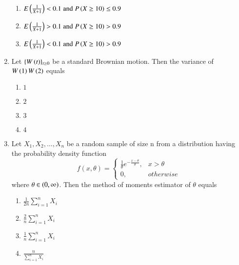 \documentclass[journal,12pt,onecolumn]{IEEEtran}
\theoremstyle{remark}
\begin{document}
\begin{enumerate}
\begin{enumerate}
    \item $E\left(\frac{1}{X+1}\right)<0.1 \; \text{and} \; P\left(X\geq10\right)\leq0.9$
    \item $E\left(\frac{1}{X+1}\right)>0.1 \; \text{and} \; P\left(X\geq10\right)>0.9$
    \item $E\left(\frac{1}{X+1}\right)<0.1 \; \text{and} \; P\left(X\geq10\right)>0.9$
\end{enumerate}
\item Let $\{W\left(t\right)\}_{t\geq 0}$ be a standard Brownian motion. Then the variance of $W\left(1\right)W\left(2\right)$ equals
\begin{enumerate}
    \item $1$
    \item $2$
    \item $3$
    \item $4$
\end{enumerate}
\item Let $X_1,X_2,\ldots,X_n$ be a random sample of size n from a distribution having the probability density function
$$
f(x,\theta) = 
\begin{cases} 
    \frac{1}{\theta}e^{-\frac{x-\theta}{\theta}}, &  x > \theta \\ 
    0, &  otherwise 
\end{cases}
$$ where $\theta \in \left(0,\infty\right)$. Then the method of moments estimator of $\theta$ equals
\begin{enumerate}
    \item $\frac{1}{2n}\sum_{i=1}^nX_i$
    \item $\frac{2}{n}\sum_{i=1}^nX_i$
    \item $\frac{1}{n}\sum_{i=1}^nX_i$
    \item $\frac{n}{\sum_{i=1}^{n}X_i}$
\end{enumerate}


\end{enumerate}
\end{document}
